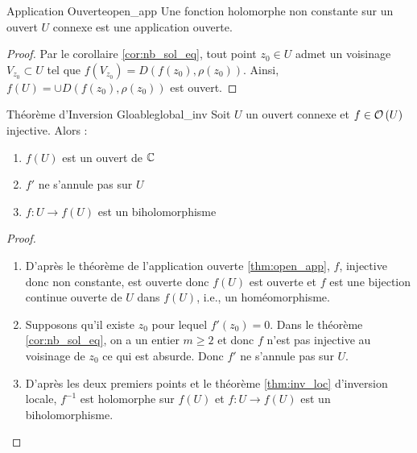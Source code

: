 \documentclass{cours}
\begin{document}
\begin{théorème}{Application Ouverte}{open_app}
    Une fonction holomorphe non constante sur un ouvert $U$ connexe est une application ouverte.
\end{théorème}
\begin{proof}
    Par le corollaire \ref{cor:nb_sol_eq}, tout point $z_{0} \in U$ admet un voisinage $V_{z_{0}} \subset U$ tel que $f\left(V_{z_{0}}\right) = D\left(f\left(z_{0}\right), \rho\left(z_{0}\right)\right)$. Ainsi, $f\left(U\right) = \cup D\left(f\left(z_{0}\right), \rho\left(z_{0}\right)\right)$ est ouvert. 
\end{proof}
\begin{théorème}{Théorème d'Inversion Gloable}{global_inv}
    Soit $U$ un ouvert connexe et $f \in \mathcal{O}\left(U\right)$ injective. Alors : 
    \begin{enumerate}
        \item $f\left(U\right)$ est un ouvert de $\mathbb{C}$
        \item $f'$ ne s'annule pas sur $U$
        \item $f : U \to f\left(U\right)$ est un biholomorphisme
    \end{enumerate}
\end{théorème}
\begin{proof}
    \begin{enumerate}
        \item D'après le théorème de l'application ouverte \ref{thm:open_app}, $f$, injective donc non constante, est ouverte donc $f\left(U\right)$ est ouverte et $f$ est une bijection continue ouverte de $U$ dans $f\left(U\right)$, i.e., un homéomorphisme. 
        \item Supposons qu'il existe $z_{0}$ pour lequel $f'\left(z_{0}\right) = 0$. Dans le théorème \ref{cor:nb_sol_eq}, on a un entier $m \geq 2$ et donc $f$ n'est pas injective au voisinage de $z_{0}$ ce qui est absurde. Donc $f'$ ne s'annule pas sur $U$. 
        \item D'après les deux premiers points et le théorème \ref{thm:inv_loc} d'inversion locale, $f^{-1}$ est holomorphe sur $f\left(U\right)$ et $f: U \to f\left(U\right)$ est un biholomorphisme.
    \end{enumerate}
\end{proof}
\end{document}

